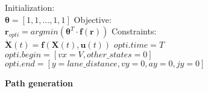 \documentclass[main_adjusted]{subfiles}
\begin{document}
\begin{algorithm}[H]
	\SetAlgoLined
	Initialization: \\
	$\bm{\theta} = [1,1,...,1,1] $
	Objective: \\
	$\bm{r}_{opti} = argmin(\bm{\theta}^T\cdot\bm{f}(\bm{r}))$\;
	Constraints: \\
	\hspace{5 mm}$\bm{\dot{X}}(t) = \bm{f}(\bm{X}(t), \bm{u}(t))$\;
	\hspace{5 mm}$opti.time = T$\; 
	\hspace{5 mm}$opti.begin = [vx = V, other\_states = 0]$\;
	\hspace{5 mm}$opti.end = [y = lane\_distance, vy = 0, ay = 0, jy = 0]$\;
	
	\caption{\textbf{Path generation}}
	\label{alg:1}
\end{algorithm}
\end{document}
